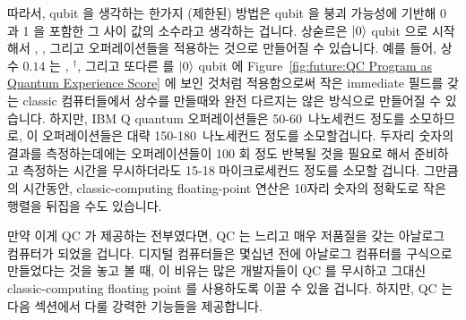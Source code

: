 따라서, qubit 을 생각하는 한가지 (제한된) 방법은 qubit 을 붕괴 가능성에 기반해
0 과 1 을 포함한 그 사이 값의 소수라고 생각하는 겁니다.
상숟르은 $\ket{0}$ qubit 으로 시작해서 , , 그리고 
오퍼레이션들을 적용하는 것으로 만들어질 수 있습니다.
예를 들어, 상수 $0.14$ 는 , $^\dagger$, 그리고 또다른  를
$\ket{0}$ qubit 에
Figure~\ref{fig:future:QC Program as Quantum Experience Score} 에 보인 것처럼
적용함으로써 작은 immediate 필드를 갖는 classic 컴퓨터들에서 상수를 만들때와
완전 다르지는 않은 방식으로 만들어질 수 있습니다.
하지만, IBM Q quantum 오퍼레이션들은 50-60~나노세컨드 정도를 소모하므로, 이
오퍼레이션들은 대략 150-180~나노세컨드 정도를 소모할겁니다.
두자리 숫자의 결과를 측정하는데에는 오퍼레이션들이 100 회 정도 반복될 것을
필요로 해서 준비하고 측정하는 시간을 무시하더라도 15-18 마이크로세컨드 정도를
소모할 겁니다.
그만큼의 시간동안, classic-computing floating-point 연산은 10자리 숫자의
정확도로 작은 행렬을 뒤집을 수도 있습니다.

만약 이게 QC 가 제공하는 전부였다면, QC 는 느리고 매우 저품질을 갖는 아날로그
컴퓨터가 되었을 겁니다.
디지털 컴퓨터들은 몇십년 전에 아날로그 컴퓨터를 구식으로 만들었다는 것을 놓고
볼 때, 이 비유는 많은 개발자들이 QC 를 무시하고 그대신 classic-computing
floating point 를 사용하도록 이끌 수 있을 겁니다.
하지만, QC 는 다음 섹션에서 다룰 강력한 기능들을 제공합니다.

